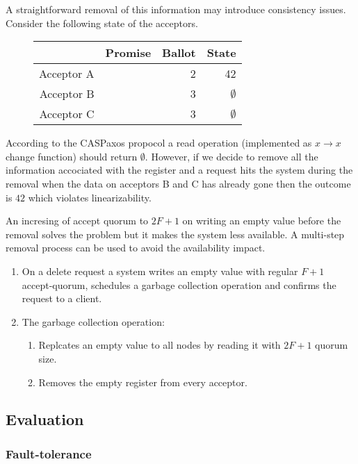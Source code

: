 \documentclass[12pt]{article}
\begin{document}
A straightforward removal of this information may introduce consistency issues. Consider the following state of the acceptors.

\begin{figure}[!h]
  \centering
  \begin{tabular}{ r|r|r|r }
    & Promise & Ballot & State \\ \hline
    Acceptor A && 2 & 42 \\
    Acceptor B && 3 & $\emptyset$ \\
    Acceptor C && 3 & $\emptyset$ \\
  \end{tabular}
\end{figure}

According to the CASPaxos propocol a read operation (implemented as $x \to x$ change function) should return $\emptyset$. However, if we decide to remove all the information accociated with the register and a request hits the system during the removal when the data on acceptors B and C has already gone then the outcome is $42$ which violates linearizability.

An incresing of accept quorum to $2F+1$ on writing an empty value before the removal solves the problem but it makes the system less available. A multi-step removal process can be used to avoid the availability impact.

\begin{enumerate}
  \item On a delete request a system writes an empty value with regular $F+1$ accept-quorum, schedules a garbage collection operation and confirms the request to a client.
  \item The garbage collection operation:
  \begin{enumerate}
    \item Replcates an empty value to all nodes by reading it with $2F+1$ quorum size.
    \item Removes the empty register from every acceptor.
  \end{enumerate}
\end{enumerate}

\subsection{Evaluation}
\subsubsection{Fault-tolerance}
\end{document}
